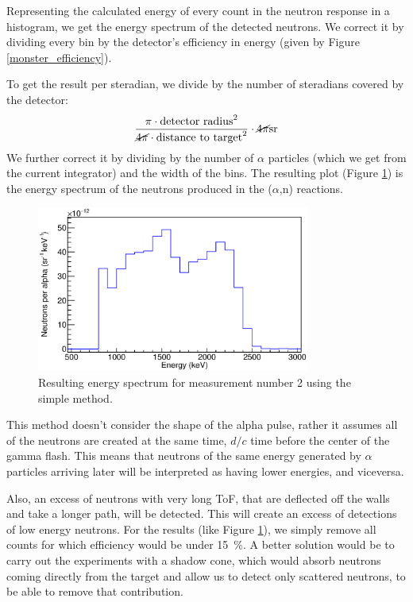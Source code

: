 \documentclass[a4paper,12pt]{report}
\newcommand{\an}{($\alpha$,n) }
\begin{document}
Representing the calculated energy of every count in the neutron response in a histogram, we get the energy spectrum of the detected neutrons.
We correct it by dividing every bin by the detector's efficiency in energy (given by Figure \ref{monster_efficiency}).

To get the result per steradian, we divide by the number of steradians covered by the detector:
\[ \frac{\pi \cdot \text{detector radius}^2}{\cancel{4 \pi} \cdot \text{distance to target}^2}\cdot \cancel{4\pi}\unit{sr}  \]
We further correct it by dividing by the number of $\alpha$ particles (which we get from the current integrator) and the width of the bins.
The resulting plot (Figure \ref{pulsed_energysimple}) is the energy spectrum of the neutrons produced in the \an reactions.

\begin{figure}[H]
	\centering
	\includegraphics[width=0.80\textwidth]{pulsed_energysimple.eps}
	\caption{Resulting energy spectrum for measurement number 2 using the simple method.}
	\label{pulsed_energysimple}
\end{figure}

This method doesn't consider the shape of the alpha pulse, rather it assumes all of the neutrons are created at the same time, $d/c$ time before the center of the gamma flash.
This means that neutrons of the same energy generated by $\alpha$ particles arriving later will be interpreted as having lower energies, and viceversa.

Also, an excess of neutrons with very long ToF, that are deflected off the walls and take a longer path, will be detected.
This will create an excess of detections of low energy neutrons.
For the results (like Figure \ref{pulsed_energysimple}), we simply remove all counts for which efficiency would be under \qty{15}{\percent}.
A better solution would be to carry out the experiments with a shadow cone, which would absorb neutrons coming directly from the target and allow us to detect only scattered neutrons, to be able to remove that contribution.
\end{document}
